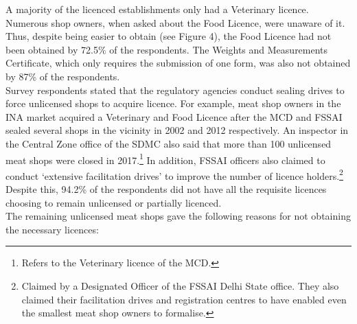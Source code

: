 \documentclass[a4paper, 12pt]{article}
\begin{document}
A majority of the licenced establishments only had a Veterinary licence. Numerous shop owners, when asked about the Food Licence, were unaware of it. Thus, despite being easier to obtain (see Figure 4), the Food Licence had not been obtained by 72.5\% of the respondents. The Weights and Measurements Certificate, which only requires the submission of one form, was also not obtained by 87\% of the respondents. \\

Survey respondents stated that the regulatory agencies conduct sealing drives to force unlicensed shops to acquire licence. For example, meat shop owners in the INA market acquired a Veterinary and Food Licence after the MCD and FSSAI sealed several shops in the vicinity in 2002 and 2012 respectively. An inspector in the Central Zone office of the SDMC also said that more than 100 unlicensed meat shops were closed in 2017.\footnote{ Refers to the Veterinary licence of the MCD.} In addition, FSSAI officers also claimed to conduct ‘extensive facilitation drives’ to improve the number of licence holders.\footnote{Claimed by a Designated Officer of the FSSAI Delhi State office. They also claimed their facilitation drives and registration centres to have enabled even the smallest meat shop owners to formalise.}
Despite this, 94.2\% of the respondents did not have all the requisite licences choosing to remain unlicensed or partially licenced.\\

The remaining unlicensed meat shops gave the following reasons for not obtaining the necessary licences:
\end{document}
